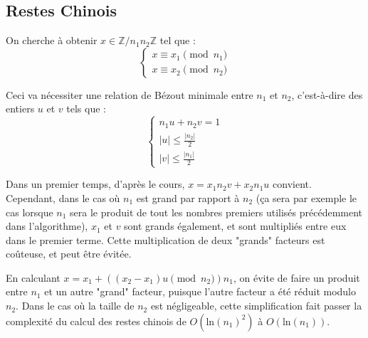 \documentclass[french]{article}
\begin{document}
\subsection{Restes Chinois} \label{subsec:chin}
On cherche à obtenir $x \in \mathbb{Z}/n_1n_2\mathbb{Z}$ tel que :
\begin{equation*}
	\begin{cases}
		x \equiv x_1 \pmod {n_1}\\
		x \equiv x_2 \pmod {n_2}
	\end{cases}
\end{equation*}
\par
Ceci va nécessiter une relation de Bézout minimale entre $n_1$ et $n_2$, c'est-à-dire des entiers $u$ et $v$ tels que :
\begin{equation*}
	\begin{cases}
		n_1 u + n_2 v = 1\\
		\lvert u \rvert \leq \frac{\lvert n_2 \rvert}{2}\\
		\lvert v \rvert  \leq \frac{\lvert n_1 \rvert}{2}
	\end{cases}
\end{equation*}
\par
Dans un premier temps, d'après le cours, $x = x_1 n_2 v + x_2 n_1 u$ convient. Cependant, dans le cas où $n_1$ est grand par rapport à $n_2$ (ça sera par exemple le cas lorsque $n_1$ sera le produit de tout les nombres premiers utilisés précédemment dans l'algorithme), $x_1$ et $v$ sont grands également, et sont multipliés entre eux dans le premier terme. Cette multiplication de deux "grands" facteurs est coûteuse, et peut être évitée.
\par
En calculant $x = x_1 + ((x_2 - x_1) u \pmod{n_2}) n_1$, on évite de faire un produit entre $n_1$ et un autre "grand" facteur, puisque l'autre facteur a été réduit modulo $n_2$. Dans le cas où la taille de $n_2$ est négligeable, cette simplification fait passer la complexité du calcul des restes chinois de $O(\mbox{ln}(n_1)^2)$ à $O(\mbox{ln}(n_1))$.
\end{document}
